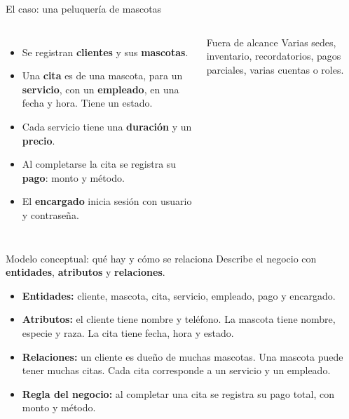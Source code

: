 \documentclass[aspectratio=169,10pt,c]{beamer}
\begin{document}
\begin{frame}{El caso: una peluquería de mascotas}
\begin{columns}[T,onlytextwidth]
\small
\begin{itemize}\setlength\itemsep{6pt}
  \item Se registran \textbf{clientes} y sus \textbf{mascotas}.
  \item Una \textbf{cita} es de una mascota, para un \textbf{servicio}, con un \textbf{empleado}, en una fecha y hora. Tiene un estado.
  \item Cada servicio tiene una \textbf{duración} y un \textbf{precio}.
  \item Al completarse la cita se registra su \textbf{pago}: monto y método.
  \item El \textbf{encargado} inicia sesión con usuario y contraseña.
\end{itemize}
\begin{exampleblock}{Fuera de alcance}
\small Varias sedes, inventario, recordatorios, pagos parciales, varias cuentas o roles.
\end{exampleblock}
\end{columns}
\vspace{0.35cm}
\end{frame}
\begin{frame}{Modelo conceptual: qué hay y cómo se relaciona}
\small Describe el negocio con \textbf{entidades}, \textbf{atributos} y \textbf{relaciones}.
\vspace{0.2cm}
\begin{itemize}\setlength\itemsep{9pt}
  \item \textbf{Entidades:} cliente, mascota, cita, servicio, empleado, pago y encargado.
  \item \textbf{Atributos:} el cliente tiene nombre y teléfono. La mascota tiene nombre, especie y raza. La cita tiene fecha, hora y estado.
  \item \textbf{Relaciones:} un cliente es dueño de muchas mascotas. Una mascota puede tener muchas citas. Cada cita corresponde a un servicio y un empleado.
  \item \textbf{Regla del negocio:} al completar una cita se registra su pago total, con monto y método.
\end{itemize}
\vspace{0.2cm}
\end{frame}
\end{document}
